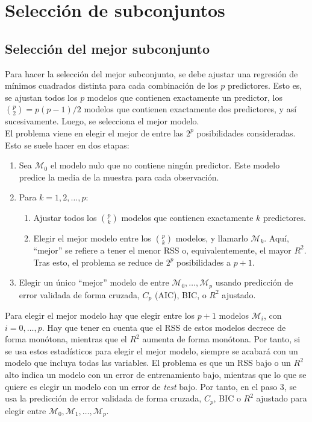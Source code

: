 \section{Selección de subconjuntos} \label{sec:6.1}

\subsection{Selección del mejor subconjunto}

Para hacer la selección del mejor subconjunto, se debe ajustar una regresión de mínimos cuadrados distinta para cada combinación de los $p$ predictores. Esto es, se ajustan todos los $p$ modelos que contienen exactamente un predictor, los $\binom{p}{2} = p(p-1)/2$ modelos que contienen exactamente dos predictores, y así sucesivamente. Luego, se selecciona el mejor modelo. \\

El problema viene en elegir el mejor de entre las $2^p$ posibilidades consideradas. Esto se suele hacer en dos etapas:
\begin{enumerate}
\item Sea $\mathcal{M}_0$ el modelo nulo que no contiene ningún predictor. Este modelo predice la media de la muestra para cada observación.
\item Para $k = 1, 2, \ldots, p$:
\begin{enumerate}
\item Ajustar todos los $\binom{p}{k}$ modelos que contienen exactamente $k$ predictores.
\item Elegir el mejor modelo entre los $\binom{p}{k}$ modelos, y llamarlo $\mathcal{M}_k$. Aquí, ``mejor'' se refiere a tener el menor RSS o, equivalentemente, el mayor $R^2$. Tras esto, el problema se reduce de $2^p$ posibilidades a $p+1$. 
\end{enumerate}
\item Elegir un único ``mejor'' modelo de entre $\mathcal{M}_0, \dots, \mathcal{M}_p$ usando predicción de error validada de forma cruzada, $C_p$ (AIC), BIC, o $R^2$ ajustado.
\end{enumerate}

Para elegir el mejor modelo hay que elegir entre los $p+1$ modelos $\mathcal{M}_i$, con $i = 0, \dots, p$. Hay que tener en cuenta que el RSS de estos modelos decrece de forma monótona, mientras que el $R^2$ aumenta de forma monótona. Por tanto, si se usa estos estadísticos para elegir el mejor modelo, siempre se acabará con un modelo que incluya todas las variables. El problema es que un RSS bajo o un $R^2$ alto indica un modelo con un error de entrenamiento bajo, mientras que lo que se quiere es elegir un modelo con un error de \textit{test} bajo. Por tanto, en el paso 3, se usa la predicción de error validada de forma cruzada, $C_p$, BIC o $R^2$ ajustado para elegir entre $\mathcal{M}_0, \mathcal{M}_1, \dots, \mathcal{M}_p$. 

